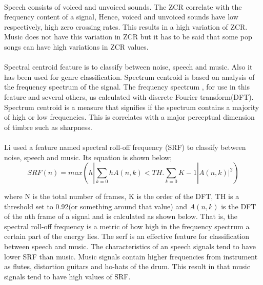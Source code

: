 \documentclass[10pt,twocolumn,letterpaper]{article}
\begin{document}
  \paragraph{} Speech consists of voiced and unvoiced sounds. The ZCR correlate with the frequency content of a signal, Hence, voiced and unvoiced sounds have low respectively, high zero crossing rates. This results in a high variation of ZCR. Music does not have this variation in ZCR but it has to be said that some pop songs can have high variations in ZCR values.
  
  \paragraph{} Spectral centroid feature is to classify between noise, speech and music. Also\cite{speech_music} it has been used for genre classification. Spectrum centroid is based on analysis of the frequency spectrum of the signal. The frequency spectrum , for use in this feature and several others, us calculated with discrete Fourier transform(DFT). Spectrum centroid is a measure that signifies if the spectrum contains a majority of high or low frequencies. This is correlates with a major perceptual dimension of timbre such as sharpness.
  
  \paragraph{}Li\cite{pattern_letters} used a feature named spectral roll-off frequency (SRF) to classify between noise, speech and music. Its equation is shown below;
  $$SRF(n) = max(h|\sum_{k=0}{h}A(n, k)<TH.\sum_{k=0}{K-1}|A(n, k)|^2)$$
  
  where N is the total number of frames, K is the order of the DFT, TH is a threshold set to 0.92(or something around that value) and $A(n,k)$ is the DFT of the nth frame of a signal and is calculated as shown below. That is, the spectral roll-off frequency is a metric of how high in the frequency spectrum a certain part of the energy lies. The serf is an effective feature for classification between speech and music. The characteristics of an speech signals tend to have lower SRF than music. Music signals contain higher frequencies from instrument as flutes, distortion guitars and ho-hats of the drum. This result in that music signals tend to have high values of SRF. 
  
\end{document}
